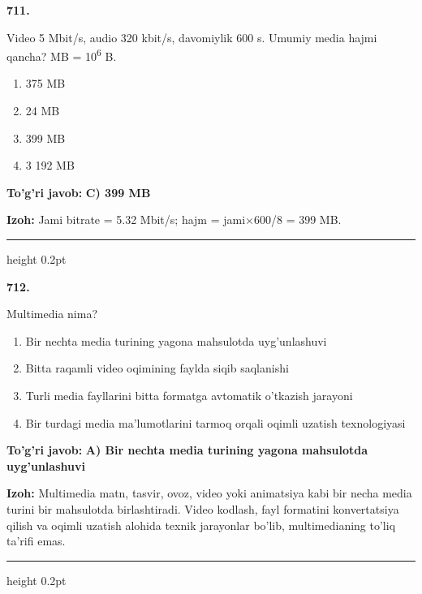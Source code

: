 \documentclass[10pt,a4paper,oneside]{article}
\begin{document}
\noindent\textbf{\color{ink}711.}
\par
Video 5 Mbit/s, audio 320 kbit/s, davomiylik 600 s. Umumiy media hajmi qancha? MB = 10\textsuperscript{6} B.
\begin{enumerate}[label=\Alph*),leftmargin=9mm]
\item 375 MB
\item 24 MB
\item 399 MB
\item 3 192 MB
\end{enumerate}
\begin{tcolorbox}[enhanced,breakable,colback=teal!4,colframe=teal!50!black,boxrule=0.5pt,arc=1.1mm,left=3mm,right=3mm,top=1.7mm,bottom=1.7mm,before skip=2mm,after skip=2mm]
\textbf{\color{teal}To'g'ri javob:} \textbf{C) 399 MB}
\par\smallskip
\textbf{Izoh:} Jami bitrate = 5.32 Mbit/s; hajm = jami\ensuremath{\times}600/8 = 399 MB.
\end{tcolorbox}
\vspace{2mm}\hrule height 0.2pt \vspace{3mm}

\noindent\textbf{\color{ink}712.}
\par
Multimedia nima?
\begin{enumerate}[label=\Alph*),leftmargin=9mm]
\item Bir nechta media turining yagona mahsulotda uyg'unlashuvi
\item Bitta raqamli video oqimining faylda siqib saqlanishi
\item Turli media fayllarini bitta formatga avtomatik o'tkazish jarayoni
\item Bir turdagi media ma'lumotlarini tarmoq orqali oqimli uzatish texnologiyasi
\end{enumerate}
\begin{tcolorbox}[enhanced,breakable,colback=teal!4,colframe=teal!50!black,boxrule=0.5pt,arc=1.1mm,left=3mm,right=3mm,top=1.7mm,bottom=1.7mm,before skip=2mm,after skip=2mm]
\textbf{\color{teal}To'g'ri javob:} \textbf{A) Bir nechta media turining yagona mahsulotda uyg'unlashuvi}
\par\smallskip
\textbf{Izoh:} Multimedia matn, tasvir, ovoz, video yoki animatsiya kabi bir necha media turini bir mahsulotda birlashtiradi. Video kodlash, fayl formatini konvertatsiya qilish va oqimli uzatish alohida texnik jarayonlar bo'lib, multimedianing to'liq ta'rifi emas.
\end{tcolorbox}
\vspace{2mm}\hrule height 0.2pt \vspace{3mm}
\end{document}
